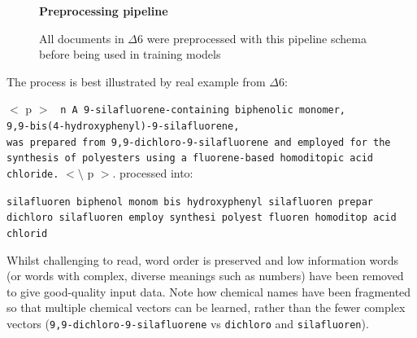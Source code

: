\begin{figure}[H]
    \centering
    \textbf{Preprocessing pipeline}\par\medskip
    \caption[Preprocessing Pipeline]{All documents in $\Delta6$ were preprocessed with this pipeline schema before being used in training models}
     \label{fig:SANPIPE}
\end{figure}
The process is best illustrated by real example from $\Delta6$:

$<$ p $>$
\texttt{ n A 9-silafluorene-containing biphenolic monomer,\\ 9,9-bis(4-hydroxyphenyl)-9-silafluorene, \\ was prepared from 9,9-dichloro-9-silafluorene and employed for the synthesis of polyesters using a fluorene-based homoditopic acid chloride.} $< \setminus$ p $>$.
\cite{sanex} 
processed into:

\texttt{silafluoren biphenol monom bis hydroxyphenyl silafluoren prepar dichloro silafluoren employ synthesi polyest fluoren homoditop acid chlorid}

Whilst challenging to read, word order is preserved and low information words (or words with complex, diverse meanings such as numbers) have been removed to give good-quality input data. Note how chemical names have been fragmented so that multiple chemical vectors can be learned, rather than the fewer complex vectors (\texttt{9,9-dichloro-9-silafluorene} vs \texttt{dichloro} and \texttt{silafluoren}).

